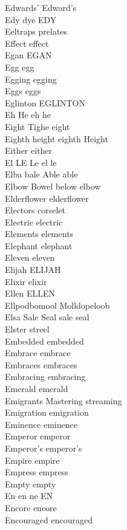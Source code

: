 Edwards' Edward's\\
Edy dye EDY\\
Eeltraps prelates\\
Effect effect\\
Egan EGAN\\
Egg egg\\
Egging egging\\
Eggs eggs\\
Eglinton EGLINTON\\
Eh He eh he\\
Eight Tighe eight\\
Eighth height eighth Height\\
Either either\\
El LE Le el le\\
Elba bale Able able\\
Elbow Bowel below elbow\\
Elderflower elderflower\\
Electors corselet\\
Electric electric\\
Elements elements\\
Elephant elephant\\
Eleven eleven\\
Elijah ELIJAH\\
Elixir elixir\\
Ellen ELLEN\\
Ellpodbomool Molldopeloob\\
Elsa Sale Seal sale seal\\
Elster streel\\
Embedded embedded\\
Embrace embrace\\
Embraces embraces\\
Embracing embracing\\
Emerald emerald\\
Emigrants Mastering streaming\\
Emigration emigration\\
Eminence eminence\\
Emperor emperor\\
Emperor's emperor's\\
Empire empire\\
Empress empress\\
Empty empty\\
En en ne EN\\
Encore encore\\
Encouraged encouraged\\
